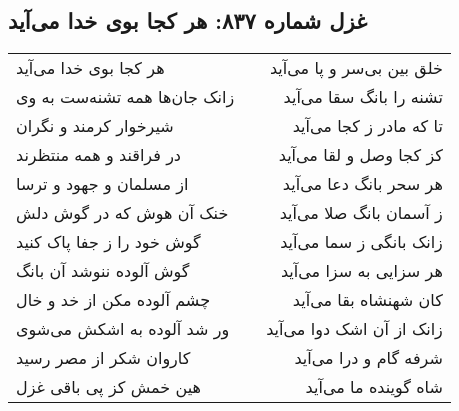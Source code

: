 \begin{center}
\section*{غزل شماره ۸۳۷: هر کجا بوی خدا می‌آید}
\label{sec:0837}
\begin{longtable}{l p{0.5cm} r}
هر کجا بوی خدا می‌آید
&&
خلق بین بی‌سر و پا می‌آید
\\
زانک جان‌ها همه تشنه‌ست به وی
&&
تشنه را بانگ سقا می‌آید
\\
شیرخوار کرمند و نگران
&&
تا که مادر ز کجا می‌آید
\\
در فراقند و همه منتظرند
&&
کز کجا وصل و لقا می‌آید
\\
از مسلمان و جهود و ترسا
&&
هر سحر بانگ دعا می‌آید
\\
خنک آن هوش که در گوش دلش
&&
ز آسمان بانگ صلا می‌آید
\\
گوش خود را ز جفا پاک کنید
&&
زانک بانگی ز سما می‌آید
\\
گوش آلوده ننوشد آن بانگ
&&
هر سزایی به سزا می‌آید
\\
چشم آلوده مکن از خد و خال
&&
کان شهنشاه بقا می‌آید
\\
ور شد آلوده به اشکش می‌شوی
&&
زانک از آن اشک دوا می‌آید
\\
کاروان شکر از مصر رسید
&&
شرفه گام و درا می‌آید
\\
هین خمش کز پی باقی غزل
&&
شاه گوینده ما می‌آید
\\
\end{longtable}
\end{center}
